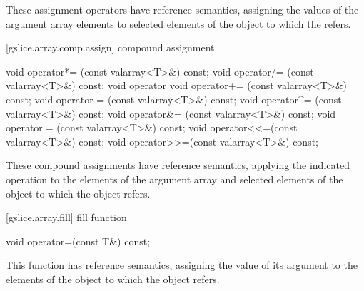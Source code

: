 \begin{itemdescr}
\pnum
These assignment operators have reference semantics, assigning the values
of the argument array elements to selected elements of the
object to which the
refers.
\end{itemdescr}

[gslice.array.comp.assign]{ compound assignment}

%
%
%
%
%
%
%
%
%
%
\begin{itemdecl}
void operator*= (const valarray<T>&) const;
void operator/= (const valarray<T>&) const;
void operator%
void operator+= (const valarray<T>&) const;
void operator-= (const valarray<T>&) const;
void operator^= (const valarray<T>&) const;
void operator&= (const valarray<T>&) const;
void operator|= (const valarray<T>&) const;
void operator<<=(const valarray<T>&) const;
void operator>>=(const valarray<T>&) const;
\end{itemdecl}

\begin{itemdescr}
\pnum
These compound assignments have reference semantics, applying the
indicated operation to the elements of the argument array and selected
elements of the
object to which the
object refers.
\end{itemdescr}

[gslice.array.fill]{ fill function}

%
\begin{itemdecl}
void operator=(const T&) const;
\end{itemdecl}

\begin{itemdescr}
\pnum
This function has reference semantics, assigning the value of its argument
to the elements of the
object to which the
object refers.
\end{itemdescr}

